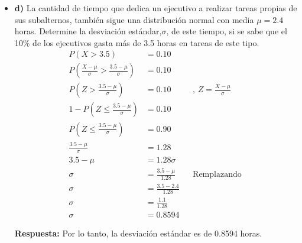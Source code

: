 \documentclass{templateNote}
\begin{document}
\begin{itemize}
  \item \textbf{d)}	La cantidad de tiempo que dedica un ejecutivo a realizar tareas propias de sus subalternos, también sigue una distribución normal con media $\mu = 2.4$ horas. Determine la desviación estándar,$\sigma$, de este tiempo, si se sabe que el 10\% de los ejecutivos gasta más de 3.5 horas en tareas de este tipo.
  \begin{align*}
    P(X > 3.5) &= 0.10 \\
    P\left(\frac{X - \mu}{\sigma} > \frac{3.5 - \mu}{\sigma}\right) &= 0.10 \\
    P\left(Z > \frac{3.5 - \mu}{\sigma}\right) &= 0.10 && \text{, } Z = \frac{X - \mu}{\sigma} \\
    1 - P\left(Z \leq \frac{3.5 - \mu}{\sigma}\right) &= 0.10 \\
    P\left(Z \leq \frac{3.5 - \mu}{\sigma}\right) &= 0.90 \\
    \frac{3.5 - \mu}{\sigma} &= 1.28 \\
    3.5 - \mu &= 1.28\sigma \\
    \sigma &= \frac{3.5 - \mu}{1.28} && \text{Remplazando } \\
    \sigma &= \frac{3.5 - 2.4}{1.28} \\
    \sigma &= \frac{1.1}{1.28} \\
    \sigma &= 0.8594
  \end{align*}

  \textbf{Respuesta:} Por lo tanto, la desviación estándar es de 0.8594 horas.
\end{itemize}
\end{document}
